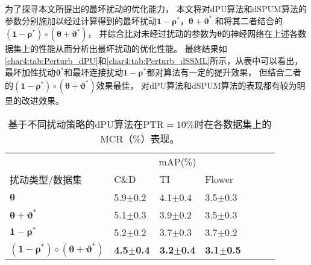 为了探寻本文所提出的最坏扰动的优化能力，
本文将对dPU算法和dSPUM算法的参数分别施加以经过计算得到的最坏扰动$\boldsymbol 1-\boldsymbol \rho^*$，$\boldsymbol \theta+\boldsymbol \vartheta^*$
和将其二者结合的$\left(\boldsymbol 1-\boldsymbol \rho^*\right)\circ\left(\boldsymbol \theta+\boldsymbol \vartheta^*\right)$，
并综合比对未经过扰动的参数为$\boldsymbol \theta$的神经网络在上述各数据集上的性能从而分析出最坏扰动的优化性能。
最终结果如\autoref{char4:tab:Perturb_dPU}和\autoref{char4:tab:Perturb_dSSML}所示，从表中可以看出，
最坏加性扰动$\boldsymbol \vartheta^*$和最坏连接扰动$\boldsymbol 1-\boldsymbol \rho^*$都对算法有一定的提升效果，
但结合二者的$\left(\boldsymbol 1-\boldsymbol \rho^*\right)\circ\left(\boldsymbol \theta+\boldsymbol \vartheta^* \right)$效果最佳，
对dPU算法和dSPUM算法的表现都有较为明显的改进效果。
\begin{table}[htbp]
    \caption{\label{char4:tab:Perturb_dPU}基于不同扰动策略的dPU算法在PTR$=10\%$时在各数据集上的MCR（\%）表现。}
    \begin{tabularx}{\textwidth}{XXXXXXX}
        \hline
        &  \multicolumn{3}{c}{mAP(\%)} \\ \cline{2-4}
        扰动类型/数据集 & C\&D & TI & Flower \\ \hline
        $\boldsymbol \theta$                         & 5.9$\pm$0.2 & 4.1$\pm$0.4 & 3.5$\pm$0.3\\
        $\boldsymbol \theta+\boldsymbol \vartheta^*$ & 5.1$\pm$0.3 & 3.9$\pm$0.2 & 3.5$\pm$0.3\\
        $\boldsymbol 1-\boldsymbol \rho^*$           & 5.2$\pm$0.2 & 3.7$\pm$0.3 & 3.7$\pm$0.2\\
        $\left(\boldsymbol 1-\boldsymbol \rho^*\right)\circ\left(\boldsymbol \theta+\boldsymbol \vartheta^* \right)$
                                                     & \textbf{4.5$\pm$0.4} & \textbf{3.2$\pm$0.4} & \textbf{3.1$\pm$0.5}\\ \hline
    \end{tabularx}
\end{table}
